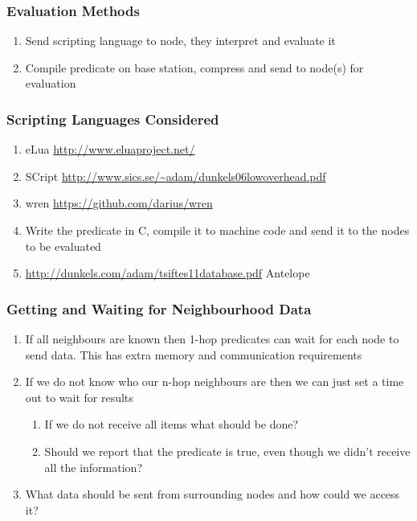 \subsubsection{Evaluation Methods}

\begin{enumerate}
	\item Send scripting language to node, they interpret and evaluate it
	\item Compile predicate on base station, compress and send to node(s) for evaluation
\end{enumerate}

\subsubsection{Scripting Languages Considered}

\begin{enumerate}
	\item eLua \url{http://www.eluaproject.net/} \cite{elua}
	\item SCript \url{http://www.sics.se/~adam/dunkels06lowoverhead.pdf} \cite{dunkels06lowoverhead}
	\item wren \url{https://github.com/darius/wren} \cite{wren}
	\item Write the predicate in C, compile it to machine code and send it to the nodes to be evaluated
	\item \url{http://dunkels.com/adam/tsiftes11database.pdf} Antelope
\end{enumerate}


\subsubsection{Getting and Waiting for Neighbourhood Data}

\begin{enumerate}
	\item If all neighbours are known then 1-hop predicates can wait for each node to send data. This has extra memory and communication requirements
	\item If we do not know who our n-hop neighbours are then we can just set a time out to wait for results
	\begin{enumerate}
		\item If we do not receive all items what should be done?
		\item Should we report that the predicate is true, even though we didn't receive all the information?
	\end{enumerate}
	\item What data should be sent from surrounding nodes and how could we access it?
\end{enumerate}



